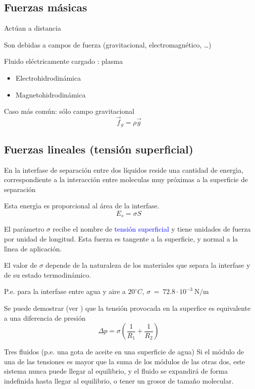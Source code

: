 \subsection{Fuerzas m\'asicas}
Act\'uan a distancia

Son debidas a campos de fuerza (gravitacional, electromagn\'etico, \ldots)

Fluido el\'ectricamente cargado : plasma
\begin{itemize}
	\item Electrohidrodin\'amica
	\item Magnetohidrodin\'amica
\end{itemize}

Caso m\'as com\'un: s\'olo campo gravitacional
$$\vec f_g = \rho \vec g$$

\subsection{Fuerzas lineales (tensi\'on superficial)}
En la interfase de separaci\'on entre dos l\'iquidos reside una cantidad de energ\'{\i}a, correspondiente
a la interacci\'on entre moleculas muy pr\'oximas a la superficie de separaci\'on

Esta energ\'{\i}a es proporcional al \'area de la interfase.
$$ E_s = \sigma S $$

El par\'ametro $\sigma$ recibe el nombre de \textcolor{blue}{tensi\'on superficial} y tiene unidades de fuerza por
unidad de longitud. Esta fuerza es tangente a la superficie, y normal a la l\'{\i}nea de aplicaci\'on.

El valor de $\sigma$ depende de la naturaleza de los materiales que separa la interfase y de su estado termodin\'amico.

P.e. para la interfase entre agua y aire a $20^\circ C$, $\sigma~=~72.8\cdot10^{-3}~\text{N/m}$


%	
Se puede demostrar (ver \cite{Bat}) que la tensi\'on provocada en la superfice es equivalente a una diferencia
de presi\'on
$$\Delta p = \sigma\left(\frac{1}{R_1}+\frac{1}{R_2}\right)$$


Tres fluidos (p.e. una gota de aceite en una superficie de agua)
%	
Si el m\'odulo de una de las tensiones es mayor que la suma de los m\'odulos de las otras dos, este sistema nunca
puede llegar al equilibrio, y el fluido se expandir\'a de forma indefinida hasta llegar al equilibrio, o tener
un grosor de tama\~no molecular.

